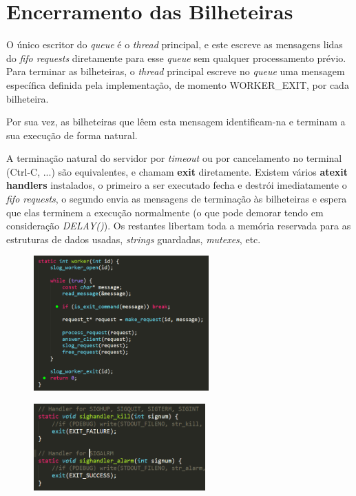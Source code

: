 \documentclass[11pt,a4paper,notitlepage]{article}
\begin{document}
\section{Encerramento das Bilheteiras}
\label{sec:workers}

O único escritor do \emph{queue} é o \emph{thread} principal,
e este escreve as mensagens lidas do \emph{fifo requests} diretamente
para esse \emph{queue} sem qualquer processamento prévio.
Para terminar as bilheteiras, o \emph{thread} principal escreve
no \emph{queue} uma mensagem específica definida pela implementação,
de momento \textup{WORKER\_EXIT}, por cada bilheteira.

Por sua vez, as bilheteiras que lêem esta mensagem identificam-na
e terminam a sua execução de forma natural.

A terminação natural do servidor por \emph{timeout} ou por cancelamento
no terminal (\textup{\mbox{Ctrl-C}}, ...) são equivalentes,
e chamam \textbf{exit}
diretamente. Existem vários \textbf{atexit handlers} instalados,
o primeiro a ser executado fecha e destrói imediatamente o
\emph{fifo requests}, o segundo envia as mensagens de terminação às
bilheteiras e espera que elas terminem a execução normalmente (o que
pode demorar tendo em consideração \textit{DELAY()}). Os restantes
libertam toda a memória reservada para as estruturas de dados usadas,
\emph{strings} guardadas, \emph{mutexes}, etc.\\

\begin{figure}[htbp]
\centering
\begin{minipage}{.5\textwidth}
\centering
\label{fig:ans}
\includegraphics[height=14em]{worker.png}
\end{minipage}%
\begin{minipage}{.5\textwidth}
\centering
\label{fig:ans}
\includegraphics[height=9em]{sighandlers.png}
\end{minipage}
\end{figure}
\end{document}
